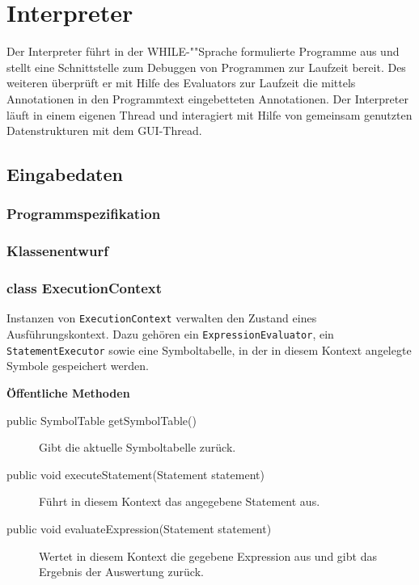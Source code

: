 \section{Interpreter}

Der Interpreter führt in der WHILE-""Sprache formulierte Programme aus und stellt eine Schnittstelle zum Debuggen von Programmen zur Laufzeit bereit. Des weiteren überprüft er mit Hilfe des Evaluators zur Laufzeit die mittels Annotationen in den Programmtext eingebetteten Annotationen. Der Interpreter läuft in einem eigenen Thread und interagiert mit Hilfe von gemeinsam genutzten Datenstrukturen mit dem GUI-Thread.

\subsection{Eingabedaten}

\subsubsection{Programmspezifikation}


\subsubsection{Klassenentwurf}

\subsubsection{class ExecutionContext}
Instanzen von \texttt{ExecutionContext} verwalten den Zustand eines Ausführungskontext. Dazu gehören ein \texttt{ExpressionEvaluator}, ein \texttt{StatementExecutor} sowie eine Symboltabelle, in der in diesem Kontext angelegte Symbole gespeichert werden.

\textbf{Öffentliche Methoden}
\begin{description}
    \item[public SymbolTable getSymbolTable()]
    Gibt die aktuelle Symboltabelle zurück.

    \item[public void executeStatement(Statement statement)]
    Führt in diesem Kontext das angegebene Statement aus.

    \item[public void evaluateExpression(Statement statement)]
    Wertet in diesem Kontext die gegebene Expression aus und gibt das Ergebnis der Auswertung zurück.
\end{description}

